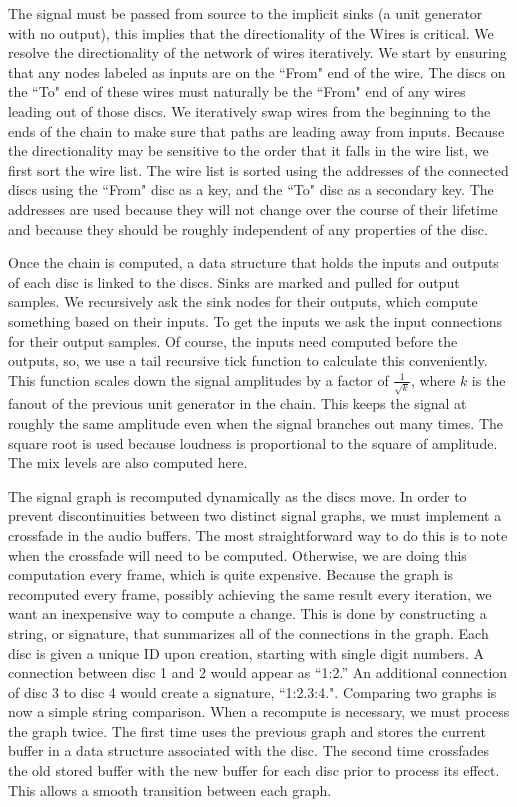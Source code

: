 \documentclass[pdftext,twoside,10pt]{article}
\begin{document}
The signal must be passed from source to the implicit sinks (a unit generator with no output), this implies that the directionality of the Wires is critical. We resolve the directionality of the network of wires iteratively. We start by ensuring that any nodes labeled as inputs are on the ``From" end of the wire. The discs on the ``To" end of these wires must naturally be the ``From" end of any wires leading out of those discs. We iteratively swap wires from the beginning to the ends of the chain to make sure that paths are leading away from inputs. Because the directionality may be sensitive to the order that it falls in the wire list, we first sort the wire list. The wire list is sorted using the addresses of the connected discs using the ``From" disc as a key, and the ``To" disc as a secondary key. The addresses are used because they will not change over the course of their lifetime and because they should be roughly independent of any properties of the disc.

Once the chain is computed, a data structure that holds the inputs and outputs of each disc is linked to the discs. Sinks are marked and pulled for output samples. We recursively ask the sink nodes for their outputs, which compute something based on their inputs. To get the inputs we ask the input connections for their output samples. Of course, the inputs need computed before the outputs, so, we use a tail recursive tick function to calculate this conveniently. This function scales down the signal amplitudes by a factor of $\frac{1}{\sqrt{k}}$, where $k$ is the fanout of the previous unit generator in the chain. This keeps the signal at roughly the same amplitude even when the signal branches out many times. The square root is used because loudness is proportional to the square of amplitude. The mix levels are also computed here. 

The signal graph is recomputed dynamically as the discs move. In order to prevent discontinuities between two distinct signal graphs, we must implement a crossfade in the audio buffers. The most straightforward way to do this is to note when the crossfade will need to be computed. Otherwise, we are doing this computation every frame, which is quite expensive. Because the graph is recomputed every frame, possibly achieving the same result every iteration, we want an inexpensive way to compute a change. This is done by constructing a string, or signature, that summarizes all of the connections in the graph. Each disc is given a unique ID upon creation, starting with single digit numbers. A connection between disc 1 and 2 would appear as ``1:2.'' An additional connection of disc 3 to disc 4 would create a signature, ``1:2.3:4.". Comparing two graphs is now a simple string comparison. When a recompute is necessary, we must process the graph twice. The first time uses the previous graph and stores the current buffer in a data structure associated with the disc. The second time crossfades the old stored buffer with the new buffer for each disc prior to process its effect. This allows a smooth transition between each graph. 
\end{document}
